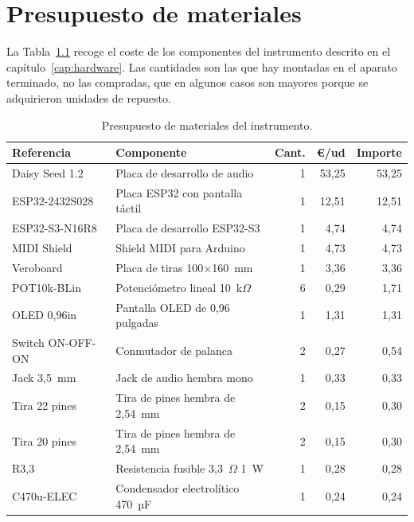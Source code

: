 \chapter{Presupuesto de materiales}
\label{anx:presupuesto}

La Tabla~\ref{tab:presupuesto} recoge el coste de los componentes del
instrumento descrito en el capítulo~\ref{cap:hardware}. Las cantidades son las
que hay montadas en el aparato terminado, no las compradas, que en algunos casos
son mayores porque se adquirieron unidades de repuesto.

\begin{table}[htbp]
    \centering
    \caption{Presupuesto de materiales del instrumento.}
    \label{tab:presupuesto}
    \begin{tabular}{llrrr}
        \toprule
        \textbf{Referencia} & \textbf{Componente} & \textbf{Cant.} &
        \textbf{€/ud} & \textbf{Importe} \\
        \midrule
        Daisy Seed 1.2      & Placa de desarrollo de audio        & 1 & 53,25 & 53,25 \\
        ESP32-2432S028      & Placa ESP32 con pantalla táctil     & 1 & 12,51 & 12,51 \\
        ESP32-S3-N16R8      & Placa de desarrollo ESP32-S3        & 1 &  4,74 &  4,74 \\
        MIDI Shield         & Shield MIDI para Arduino            & 1 &  4,73 &  4,73 \\
        Veroboard           & Placa de tiras 100$\times$160~mm    & 1 &  3,36 &  3,36 \\
        POT10k-BLin         & Potenciómetro lineal 10~k$\Omega$   & 6 &  0,29 &  1,71 \\
        OLED 0,96in         & Pantalla OLED de 0,96 pulgadas      & 1 &  1,31 &  1,31 \\
        Switch ON-OFF-ON    & Conmutador de palanca               & 2 &  0,27 &  0,54 \\
        Jack 3,5~mm         & Jack de audio hembra mono           & 1 &  0,33 &  0,33 \\
        Tira 22 pines       & Tira de pines hembra de 2,54~mm     & 2 &  0,15 &  0,30 \\
        Tira 20 pines       & Tira de pines hembra de 2,54~mm     & 2 &  0,15 &  0,30 \\
        R3,3                & Resistencia fusible 3,3~$\Omega$ 1~W & 1 & 0,28 &  0,28 \\
        C470u-ELEC          & Condensador electrolítico 470~µF    & 1 &  0,24 &  0,24 \\

\end{tabular}
\end{table}
